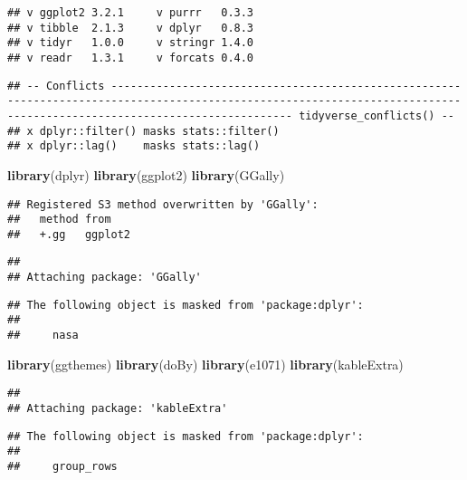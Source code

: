 \documentclass[]{article}
\newenvironment{Shaded}{\begin{snugshade}}{\end{snugshade}}
\newcommand{\KeywordTok}[1]{\textcolor[rgb]{0.13,0.29,0.53}{\textbf{#1}}}
\newcommand{\NormalTok}[1]{#1}
\begin{document}
\begin{verbatim}
## v ggplot2 3.2.1     v purrr   0.3.3
## v tibble  2.1.3     v dplyr   0.8.3
## v tidyr   1.0.0     v stringr 1.4.0
## v readr   1.3.1     v forcats 0.4.0
\end{verbatim}

\begin{verbatim}
## -- Conflicts ------------------------------------------------------------------------------------------------------------------------------------------------------------------------ tidyverse_conflicts() --
## x dplyr::filter() masks stats::filter()
## x dplyr::lag()    masks stats::lag()
\end{verbatim}

\begin{Shaded}
\begin{Highlighting}[]
\KeywordTok{library}\NormalTok{(dplyr)}
\KeywordTok{library}\NormalTok{(ggplot2)}
\KeywordTok{library}\NormalTok{(GGally)}
\end{Highlighting}
\end{Shaded}

\begin{verbatim}
## Registered S3 method overwritten by 'GGally':
##   method from   
##   +.gg   ggplot2
\end{verbatim}

\begin{verbatim}
## 
## Attaching package: 'GGally'
\end{verbatim}

\begin{verbatim}
## The following object is masked from 'package:dplyr':
## 
##     nasa
\end{verbatim}

\begin{Shaded}
\begin{Highlighting}[]
\KeywordTok{library}\NormalTok{(ggthemes)}
\KeywordTok{library}\NormalTok{(doBy)}
\KeywordTok{library}\NormalTok{(e1071)}
\KeywordTok{library}\NormalTok{(kableExtra)}
\end{Highlighting}
\end{Shaded}

\begin{verbatim}
## 
## Attaching package: 'kableExtra'
\end{verbatim}

\begin{verbatim}
## The following object is masked from 'package:dplyr':
## 
##     group_rows
\end{verbatim}
\end{document}
